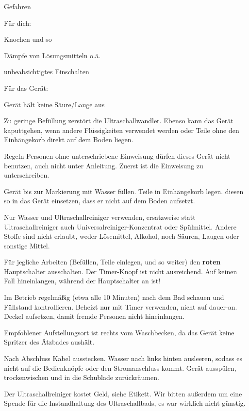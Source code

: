 
\begin{section}{Gefahren}

Für dich:

 Knochen und so

Dämpfe von Lösungsmitteln o.ä.

unbeabsichtigtes Einschalten


Für das Gerät:

Gerät hält keine Säure/Lauge aus

Zu geringe Befüllung zerstört die Ultraschallwandler. Ebenso kann das Gerät kaputtgehen, wenn andere Flüssigkeiten verwendet werden oder Teile ohne den Einhängekorb direkt auf dem Boden liegen.

\end{section}


\begin{section}{Regeln}
Personen ohne unterschriebene Einweisung dürfen dieses Gerät nicht benutzen, auch nicht unter Anleitung. Zuerst ist die Einweisung zu unterschreiben.

Gerät bis zur Markierung mit Wasser füllen. Teile in Einhängekorb legen. diesen so in das Gerät einsetzen, dass er nicht auf dem Boden aufsetzt.

Nur Wasser und Ultraschallreiniger verwenden, ersatzweise statt Ultraschallreiniger auch Universalreiniger-Konzentrat oder Spülmittel. Andere Stoffe sind nicht erlaubt, weder Lösemittel, Alkohol, noch Säuren, Laugen oder sonstige Mittel.

Für jegliche Arbeiten (Befüllen, Teile einlegen, und so weiter) den \textbf{roten} Hauptschalter ausschalten. Der Timer-Knopf ist nicht ausreichend. Auf keinen Fall hineinlangen, während der Hauptschalter an ist!

Im Betrieb regelmäßig (etwa alle 10 Minuten) nach dem Bad schauen und Füllstand kontrollieren. Beheizt nur mit Timer verwenden, nicht auf dauer-an. Deckel aufsetzen, damit fremde Personen nicht hineinlangen.

Empfohlener Aufstellungsort ist rechts vom Waschbecken, da das Gerät keine Spritzer des Ätzbades aushält.

Nach Abschluss Kabel ausstecken. Wasser nach links hinten ausleeren, sodass es nicht auf die Bedienknöpfe oder den Stromanschluss kommt. Gerät ausspülen, trockenwischen und in die Schublade zurückräumen.

Der Ultraschallreiniger kostet Geld, siehe Etikett. Wir bitten außerdem um eine Spende für die Instandhaltung des Ultraschallbads, es war wirklich nicht günstig.
\end{section}


